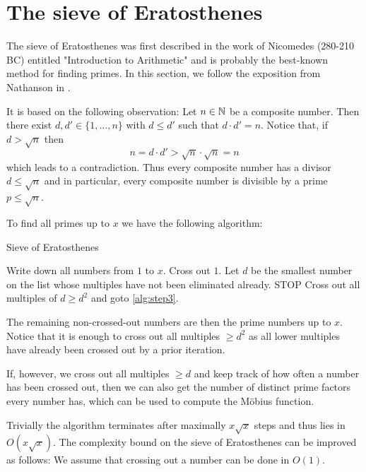 \section{The sieve of Eratosthenes}
\label{sec:eratosthenes}
The sieve of Eratosthenes was first described in the work of Nicomedes (280-210 BC) entitled "Introduction to Arithmetic" and is probably 
the best-known method for finding primes. In this section, we follow the exposition from Nathanson in \cite{nathanson00}.

It is based on the following observation: Let $n \in \mathbb{N}$ be a composite number. Then there exist $d, d' \in \{1,\ldots,n\}$ with $d \leq d'$ such that 
$d \cdot d' = n$. Notice that, if $d > \sqrt{n}$ then
\[
n = d \cdot  d' > \sqrt{n} \cdot \sqrt{n} = n
\] 
which leads to a contradiction.
Thus every composite number has a divisor $d \leq \sqrt{n}$ and in particular, every composite number is divisible by a prime $p \leq \sqrt{n}$.

To find all primes up to $x$ we have the following algorithm:

\begin{algorithm}
	\caption{Sieve of Eratosthenes}
	\begin{algorithmic}[1]
		\State Write down all numbers from $1$ to $x$.
		\State Cross out $1$.
		\State Let  $d$ be the smallest number on the list whose multiples have not been eliminated already.\label{alg:step3}
			\State STOP
		\Else
			\State Cross out all multiples of $d \geq d^2$ and goto \ref{alg:step3}.
		\EndIf
	\end{algorithmic}
\end{algorithm}
The remaining non-crossed-out numbers are then the prime numbers up to  $x$.
Notice that it is enough to cross out all multiples $\geq d^2$ as all lower multiples have already been crossed out by
a prior iteration.

\begin{remark}
	If, however, we cross out all multiples $\geq d$ and keep track of how often a number has been crossed out,
	then we can also get the number of distinct prime factors every number has, which can be used to compute
	the Möbius function.
\end{remark}

Trivially the algorithm terminates after maximally $x \sqrt{x}$ steps and thus lies in $O(x\sqrt{x})$.
The complexity bound on the sieve of Eratosthenes can be improved as follows:
We assume that crossing out a number can be done in $O(1)$.

